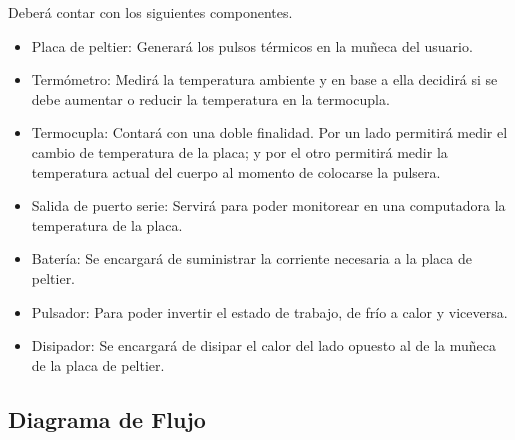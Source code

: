 \documentclass[10pt,spanish,a4paper,openany,notitlepage]{article}
\begin{document}
Deberá contar con los siguientes componentes.

\begin{itemize}
\item{Placa de peltier:} Generará los pulsos térmicos en la muñeca del usuario.
\item{Termómetro:} Medirá la temperatura ambiente y en base a ella decidirá 
si se debe aumentar o reducir la temperatura en la termocupla.
\item{Termocupla:} Contará con una doble finalidad. Por un lado permitirá 
medir el cambio de temperatura de la placa; y por el otro permitirá medir 
la temperatura actual del cuerpo al momento de colocarse la pulsera.
\item{Salida de puerto serie:} Servirá para poder monitorear en una 
computadora la temperatura de la placa.
\item{Batería:} Se encargará de suministrar la corriente necesaria a la 
placa de peltier.
\item{Pulsador:} Para poder invertir el estado de trabajo, de frío a calor 
y viceversa.
\item{Disipador:} Se encargará de disipar el calor del lado opuesto al de 
la muñeca de la placa de peltier.
\end{itemize}

\subsection{Diagrama de Flujo}
\end{document}
